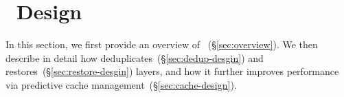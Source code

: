 \section{\sysname~Design}
\label{sec:Sift}

%
In this section, we first provide an overview of
\sysname~(\S\ref{sec:overview}).
%
We then describe in detail how \sysname deduplicates~(\S\ref{sec:dedup-desgin})
and restores~(\S\ref{sec:restore-desgin}) layers, and how it further improves
performance via predictive cache management~(\S\ref{sec:cache-design}).








